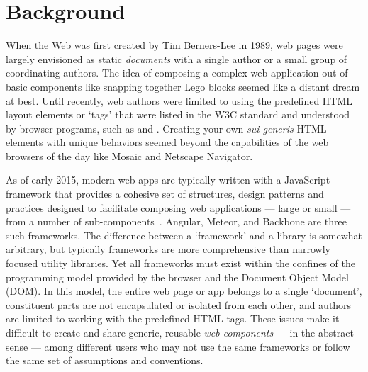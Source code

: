 \chapter{Background}
%
\label{ch:background}

When the Web was first created by Tim Berners-Lee in 1989, web pages were largely envisioned as static \textit{documents} with a single author or a small group of coordinating authors. 
The idea of composing a complex web application out of basic components like snapping together Lego blocks seemed like a distant dream at best.
Until recently, web authors were limited to using the predefined HTML layout elements or `tags' that were listed in the W3C standard and understood by browser programs, such as  and . 
Creating your own \textit{sui generis} HTML elements with unique behaviors seemed beyond the capabilities of the web browsers of the day like Mosaic
and Netscape Navigator.

As of early 2015, modern web apps are typically written with a JavaScript framework that provides a cohesive set of structures, design patterns and practices designed to facilitate composing web applications 
--- large or small --- 
from a number of sub-com\-ponents~\cite{dickey2014}.
Angular, Meteor, and Backbone are three such frameworks.
The difference between a `framework' and a library is somewhat arbitrary, but typically frameworks are more comprehensive than narrowly focused utility libraries.
Yet all frameworks must exist within the confines of the programming model provided by the browser and the Document Object Model (DOM). 
In this model, the entire web page or app belongs to a single `document', constituent parts are not encapsulated or isolated from each other, and authors are limited to working with the predefined HTML tags.
These issues make it difficult to create and share generic, reusable \textit{web components} 
--- in the abstract sense --- 
among different users who may not use the same frameworks or follow the same set of assumptions and conventions.

